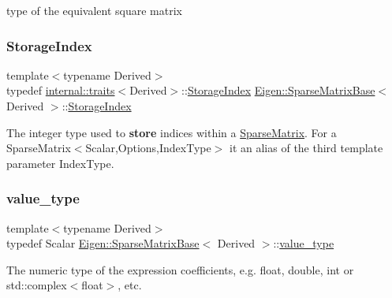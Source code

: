 type of the equivalent square matrix \mbox{\label{class_eigen_1_1_sparse_matrix_base_a0b540ba724726ebe953f8c0df06081ed}} 
\subsubsection{\texorpdfstring{StorageIndex}{StorageIndex}}
{\footnotesize\ttfamily template$<$typename Derived$>$ \\
typedef \mbox{\hyperlink{struct_eigen_1_1internal_1_1traits}{internal\+::traits}}$<$Derived$>$\+::\mbox{\hyperlink{class_eigen_1_1_sparse_matrix_base_a0b540ba724726ebe953f8c0df06081ed}{Storage\+Index}} \mbox{\hyperlink{class_eigen_1_1_sparse_matrix_base}{Eigen\+::\+Sparse\+Matrix\+Base}}$<$ Derived $>$\+::\mbox{\hyperlink{class_eigen_1_1_sparse_matrix_base_a0b540ba724726ebe953f8c0df06081ed}{Storage\+Index}}}

The integer type used to {\bfseries{store}} indices within a \mbox{\hyperlink{class_eigen_1_1_sparse_matrix}{Sparse\+Matrix}}. For a {\ttfamily Sparse\+Matrix$<$\+Scalar,\+Options,\+Index\+Type$>$} it an alias of the third template parameter {\ttfamily Index\+Type}. \mbox{\label{class_eigen_1_1_sparse_matrix_base_ac254d3b61718ebc2136d27bac043dcb7}} 
\subsubsection{\texorpdfstring{value\_type}{value\_type}}
{\footnotesize\ttfamily template$<$typename Derived$>$ \\
typedef Scalar \mbox{\hyperlink{class_eigen_1_1_sparse_matrix_base}{Eigen\+::\+Sparse\+Matrix\+Base}}$<$ Derived $>$\+::\mbox{\hyperlink{class_eigen_1_1_sparse_matrix_base_ac254d3b61718ebc2136d27bac043dcb7}{value\+\_\+type}}}

The numeric type of the expression\textquotesingle{} coefficients, e.\+g. float, double, int or std\+::complex$<$float$>$, etc.

